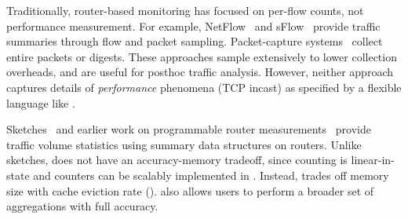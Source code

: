 


 Traditionally, router-based monitoring has
focused on per-flow counts, not performance measurement. For example,
NetFlow~\cite{netflow} and sFlow~\cite{sflow} provide traffic summaries
through flow and packet sampling. Packet-capture systems~\cite{cisco-span,
niksun, netsight, everflow, pathdump, path_query} collect entire packets or
digests. These approaches sample extensively to lower collection
overheads, and are useful for posthoc traffic analysis. However, neither
approach captures details of {\em performance} phenomena (\eg TCP incast) as
specified by a flexible language like \TheSystem.

 Sketches~\cite{univmon, flowradar, counterbraids, dream} and
earlier work on programmable router measurements~\cite{progme, opensketch}
provide traffic volume statistics using summary data structures on routers.
Unlike sketches, \TheSystem does not have an accuracy-memory tradeoff, since
counting is linear-in-state and counters can be scalably implemented in \TheSystem. Instead,
\TheSystem trades off memory size with cache eviction rate ().
\TheSystem also allows users to perform a broader set of aggregations with full
accuracy.

